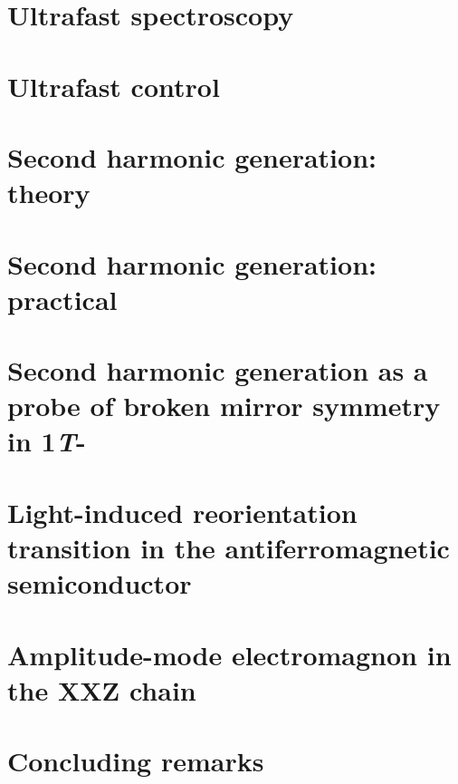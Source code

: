 \documentclass[
    letterpaper,
    12pt,
    openbib,
]{memoir}
\begin{document}
\frontmatter*



\tableofcontents
\listoffigures
\listoftables

\mainmatter*
\chapter{Ultrafast spectroscopy}
\chapter{Ultrafast control}
\chapter{Second harmonic generation: theory}
\chapter{Second harmonic generation: practical}
\chapter{Second harmonic generation as a probe of broken mirror symmetry in 1\textit{T}-}
\chapter{Light-induced reorientation transition in the antiferromagnetic semiconductor }
\chapter{Amplitude-mode electromagnon in the XXZ chain }
\chapter{Concluding remarks}

\backmatter
\begin{thebibliography}

\end{thebibliography}
\end{document}
